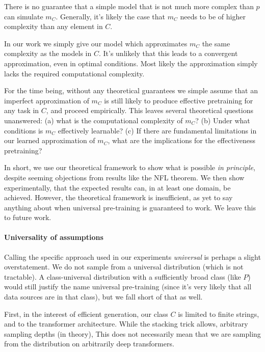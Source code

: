 \documentclass{article} %
\begin{document}
There is no guarantee that a simple model that is not much more complex than $p$ can simulate $m_C$. Generally, it's likely the case that $m_C$ needs to be of higher complexity than any element in $C$.\footnotemark


In our work we simply give our model which approximates $m_C$ the same complexity as the models in $C$. It's unlikely that this leads to a convergent approximation, even in optimal conditions. Most likely the approximation simply lacks the required computational complexity. 

For the time being, without any theoretical guarantees we simple assume that an imperfect approximation of $m_C$ is still likely to produce effective pretraining for any task in $C$, and proceed empirically. This leaves several theoretical questions unanswered: (a) what is the computational complexity of $m_C$? (b) Under what conditions is $m_C$ effectively learnable? (c) If there are fundamental limitations in our learned approximation of $m_C$, what are the implications for the effectiveness pretraining?

In short, we use our theoretical framework to show what is possible \emph{in principle}, despite seeming objections from results like the NFL theorem. We then show experimentally, that the expected results can, in at least one domain, be achieved. However, the theoretical framework is insufficient, as yet to say anything about when universal pre-training is guaranteed to work. We leave this to future work.

\paragraph{Universality of assumptions} Calling the specific approach used in our experiments \emph{universal} is perhaps a slight overstatement. We do not sample from a universal distribution (which is not tractable). A class-universal distribution with a sufficiently broad class (like $P$) would still justify the name universal pre-training (since it's very likely that all data sources are in that class), but we fall short of that as well.

First, in the interest of efficient generation, our class $C$ is limited to finite strings, and to the transformer architecture. While the stacking trick allows, arbitrary sampling depths (in theory), This does not necessarily mean that we are sampling from the distribution on arbitrarily deep transformers. 
\end{document}
